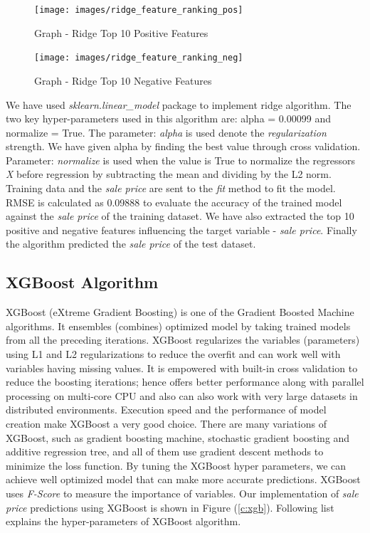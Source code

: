 \documentclass[sigconf]{acmart}
\begin{document}
	\begin{figure}[htb]
		\centering
		\texttt{[image: images/ridge\_feature\_ranking\_pos]}	
		\caption{Graph - Ridge Top 10 Positive Features} \label{fig:ridge-feature-ranking-pos} 
	\end{figure}
	
	\begin{figure}[htb]
		\centering
		\texttt{[image: images/ridge\_feature\_ranking\_neg]}	
		\caption{Graph - Ridge Top 10 Negative Features} \label{fig:ridge-feature-ranking-neg} 
	\end{figure}
	
	We have used {\em sklearn.linear\_model} package to implement ridge algorithm. The two key hyper-parameters used in this algorithm are: alpha = 0.00099 and normalize = True. The parameter: {\em alpha} is used  denote the {\em regularization} strength. We have given alpha by finding the best value through cross validation. Parameter: {\em normalize} is used when the value is True to normalize the regressors {\em X} before regression by subtracting the mean and dividing by the L2 norm.  Training data and the {\em sale price} are sent to the {\em fit} method to fit the model. RMSE is calculated as 0.09888 to evaluate the accuracy of the trained model against the {\em sale price} of the training dataset. We have also extracted the top 10 positive and negative features influencing the target variable - {\em sale price}. Finally the algorithm predicted the {\em sale price} of the test dataset. 
	
	\subsection{XGBoost Algorithm}
	
	XGBoost (eXtreme Gradient Boosting) is one of the Gradient Boosted Machine algorithms. It ensembles (combines) optimized model by taking trained models from all the preceding iterations. XGBoost regularizes the variables (parameters) using L1 and L2 regularizations to reduce the overfit and can work well with variables having missing values. It is empowered with built-in cross validation to reduce the boosting iterations; hence offers better performance along with parallel processing on multi-core CPU and also can also work with very large datasets in distributed environments. Execution speed and the performance of model creation make XGBoost a very good choice. There are many variations of XGBoost, such as gradient boosting machine, stochastic gradient boosting and additive regression tree, and all of them use gradient descent methods to minimize the loss function. By tuning the XGBoost hyper parameters, we can achieve well optimized model that can make more accurate predictions. XGBoost uses {\em F-Score} to measure the importance of  variables. Our implementation of {\em sale price} predictions using XGBoost is shown in Figure (\ref{c:xgb}). Following list explains the hyper-parameters of XGBoost algorithm.
\end{document}
